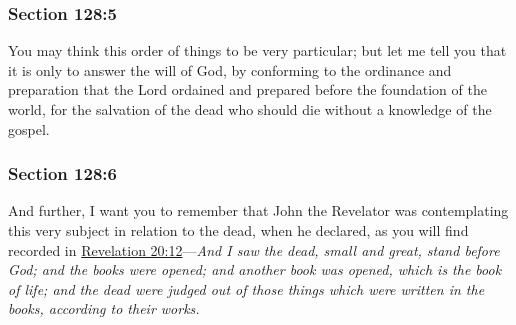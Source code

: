 
	\subsubsection{Section 128:5} %
		\label{DC128-5}

		You may think this order of things to be very particular; but let me tell you that it is only to answer the will of God, by conforming to the ordinance and preparation that the Lord ordained and prepared before the foundation of the world, for the salvation of the dead who should die without a knowledge of the gospel.


	\subsubsection{Section 128:6} %
		\label{DC128-6}

		And further, I want you to remember that John the Revelator was contemplating this very subject in relation to the dead, when he declared, as you will find recorded in \hyperref[REVELATIONNT-20-12]{Revelation 20:12}---\textit{And I saw the dead, small and great, stand before God; and the books were opened; and another book was opened, which is the book of life; and the dead were judged out of those things which were written in the books, according to their works.}


